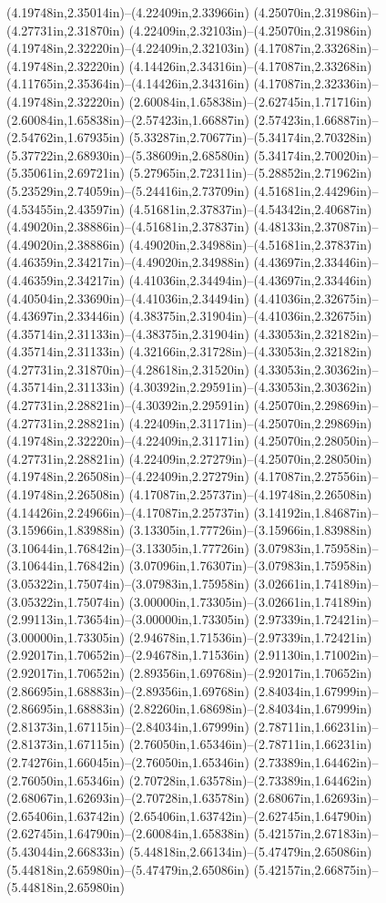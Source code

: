 (4.19748in,2.35014in)--(4.22409in,2.33966in) (4.25070in,2.31986in)--(4.27731in,2.31870in) (4.22409in,2.32103in)--(4.25070in,2.31986in) (4.19748in,2.32220in)--(4.22409in,2.32103in) (4.17087in,2.33268in)--(4.19748in,2.32220in) (4.14426in,2.34316in)--(4.17087in,2.33268in) (4.11765in,2.35364in)--(4.14426in,2.34316in) (4.17087in,2.32336in)--(4.19748in,2.32220in) (2.60084in,1.65838in)--(2.62745in,1.71716in) (2.60084in,1.65838in)--(2.57423in,1.66887in) (2.57423in,1.66887in)--(2.54762in,1.67935in) (5.33287in,2.70677in)--(5.34174in,2.70328in) (5.37722in,2.68930in)--(5.38609in,2.68580in) (5.34174in,2.70020in)--(5.35061in,2.69721in) (5.27965in,2.72311in)--(5.28852in,2.71962in) (5.23529in,2.74059in)--(5.24416in,2.73709in) (4.51681in,2.44296in)--(4.53455in,2.43597in) (4.51681in,2.37837in)--(4.54342in,2.40687in) (4.49020in,2.38886in)--(4.51681in,2.37837in) (4.48133in,2.37087in)--(4.49020in,2.38886in) (4.49020in,2.34988in)--(4.51681in,2.37837in) (4.46359in,2.34217in)--(4.49020in,2.34988in) (4.43697in,2.33446in)--(4.46359in,2.34217in) (4.41036in,2.34494in)--(4.43697in,2.33446in) (4.40504in,2.33690in)--(4.41036in,2.34494in) (4.41036in,2.32675in)--(4.43697in,2.33446in) (4.38375in,2.31904in)--(4.41036in,2.32675in) (4.35714in,2.31133in)--(4.38375in,2.31904in) (4.33053in,2.32182in)--(4.35714in,2.31133in) (4.32166in,2.31728in)--(4.33053in,2.32182in) (4.27731in,2.31870in)--(4.28618in,2.31520in) (4.33053in,2.30362in)--(4.35714in,2.31133in) (4.30392in,2.29591in)--(4.33053in,2.30362in) (4.27731in,2.28821in)--(4.30392in,2.29591in) (4.25070in,2.29869in)--(4.27731in,2.28821in) (4.22409in,2.31171in)--(4.25070in,2.29869in) (4.19748in,2.32220in)--(4.22409in,2.31171in) (4.25070in,2.28050in)--(4.27731in,2.28821in) (4.22409in,2.27279in)--(4.25070in,2.28050in) (4.19748in,2.26508in)--(4.22409in,2.27279in) (4.17087in,2.27556in)--(4.19748in,2.26508in) (4.17087in,2.25737in)--(4.19748in,2.26508in) (4.14426in,2.24966in)--(4.17087in,2.25737in) (3.14192in,1.84687in)--(3.15966in,1.83988in) (3.13305in,1.77726in)--(3.15966in,1.83988in) (3.10644in,1.76842in)--(3.13305in,1.77726in) (3.07983in,1.75958in)--(3.10644in,1.76842in) (3.07096in,1.76307in)--(3.07983in,1.75958in) (3.05322in,1.75074in)--(3.07983in,1.75958in) (3.02661in,1.74189in)--(3.05322in,1.75074in) (3.00000in,1.73305in)--(3.02661in,1.74189in) (2.99113in,1.73654in)--(3.00000in,1.73305in) (2.97339in,1.72421in)--(3.00000in,1.73305in) (2.94678in,1.71536in)--(2.97339in,1.72421in) (2.92017in,1.70652in)--(2.94678in,1.71536in) (2.91130in,1.71002in)--(2.92017in,1.70652in) (2.89356in,1.69768in)--(2.92017in,1.70652in) (2.86695in,1.68883in)--(2.89356in,1.69768in) (2.84034in,1.67999in)--(2.86695in,1.68883in) (2.82260in,1.68698in)--(2.84034in,1.67999in) (2.81373in,1.67115in)--(2.84034in,1.67999in) (2.78711in,1.66231in)--(2.81373in,1.67115in) (2.76050in,1.65346in)--(2.78711in,1.66231in) (2.74276in,1.66045in)--(2.76050in,1.65346in) (2.73389in,1.64462in)--(2.76050in,1.65346in) (2.70728in,1.63578in)--(2.73389in,1.64462in) (2.68067in,1.62693in)--(2.70728in,1.63578in) (2.68067in,1.62693in)--(2.65406in,1.63742in) (2.65406in,1.63742in)--(2.62745in,1.64790in) (2.62745in,1.64790in)--(2.60084in,1.65838in) (5.42157in,2.67183in)--(5.43044in,2.66833in) (5.44818in,2.66134in)--(5.47479in,2.65086in) (5.44818in,2.65980in)--(5.47479in,2.65086in) (5.42157in,2.66875in)--(5.44818in,2.65980in) 